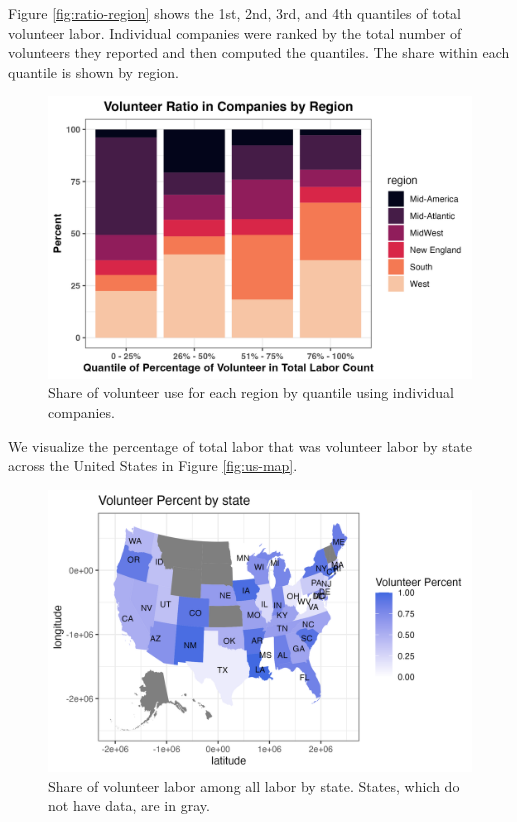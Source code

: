 \documentclass[Dance Data
Project,article,submit,moreauthors,pdftex]{mdpi}
\begin{document}
Figure \ref{fig:ratio-region} shows the 1st, 2nd, 3rd, and 4th quantiles
of total volunteer labor. Individual companies were ranked by the total
number of volunteers they reported and then computed the quantiles. The
share within each quantile is shown by region.

\begin{figure}[H]
\includegraphics[width=0.9\linewidth,]{../images/ratio_bar_region} \caption{\label{fig:ratio-region}Share of volunteer use for each region by quantile using individual companies.}\label{fig:unnamed-chunk-15}
\end{figure}

We visualize the percentage of total labor that was volunteer labor by
state across the United States in Figure \ref{fig:us-map}.

\begin{figure}[H]
\includegraphics[width=0.9\linewidth,]{../images/vol_map} \caption{\label{fig:us-map}Share of volunteer labor among all labor by state. States, which do not have data, are in gray.}\label{fig:unnamed-chunk-16}
\end{figure}
\end{document}
